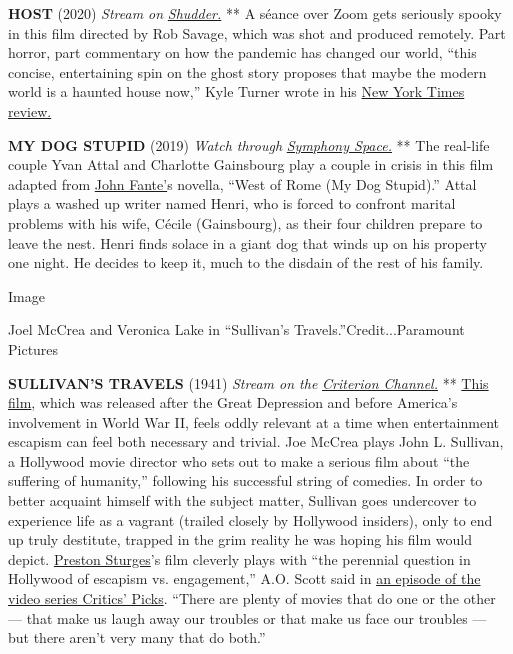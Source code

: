 \textbf{HOST} (2020) \emph{Stream on}
\href{https://www.shudder.com/}{\emph{Shudder.}} ** A séance over Zoom
gets seriously spooky in this film directed by Rob Savage, which was
shot and produced remotely. Part horror, part commentary on how the
pandemic has changed our world, ``this concise, entertaining spin on the
ghost story proposes that maybe the modern world is a haunted house
now,'' Kyle Turner wrote in his
\href{https://www.nytimes3xbfgragh.onion/2020/07/30/movies/host-review.html}{New
York Times review.}

\textbf{MY DOG STUPID} (2019) \emph{Watch through}
\href{https://distribfilmsusvirtual.vhx.tv/products/my-dog-stupid-symphony-space}{\emph{Symphony
Space.}} ** The real-life couple Yvan Attal and Charlotte Gainsbourg
play a couple in crisis in this film adapted from
\href{https://www.nytimes3xbfgragh.onion/2002/02/28/books/books-of-the-times-a-truly-famous-unknown-writer.html?searchResultPosition=1}{John
Fante'}s novella, ``West of Rome (My Dog Stupid).'' Attal plays a washed
up writer named Henri, who is forced to confront marital problems with
his wife, Cécile (Gainsbourg), as their four children prepare to leave
the nest. Henri finds solace in a giant dog that winds up on his
property one night. He decides to keep it, much to the disdain of the
rest of his family.

Image

Joel McCrea and Veronica Lake in ``Sullivan's
Travels.''Credit...Paramount Pictures

\textbf{SULLIVAN'S TRAVELS} (1941) \emph{Stream on the}
\href{https://www.criterionchannel.com/}{\emph{Criterion Channel.}} **
\href{https://www.nytimes3xbfgragh.onion/1942/01/29/archives/comic-tour-in-sullivans-travels-on-the-paramounts-screen-a-yank-on.html}{This
film}, which was released after the Great Depression and before
America's involvement in World War II, feels oddly relevant at a time
when entertainment escapism can feel both necessary and trivial. Joe
McCrea plays John L. Sullivan, a Hollywood movie director who sets out
to make a serious film about ``the suffering of humanity,'' following
his successful string of comedies. In order to better acquaint himself
with the subject matter, Sullivan goes undercover to experience life as
a vagrant (trailed closely by Hollywood insiders), only to end up truly
destitute, trapped in the grim reality he was hoping his film would
depict.
\href{https://www.nytimes3xbfgragh.onion/2005/04/01/movies/sturgess-travels-a-screwball-tale.html}{Preston
Sturges}'s film cleverly plays with ``the perennial question in
Hollywood of escapism vs. engagement,'' A.O. Scott said in
\href{https://www.nytimes3xbfgragh.onion/video/arts/1194826561460/critics-picks-sullivan-s-travels.html}{an
episode of the video series Critics' Picks}. ``There are plenty of
movies that do one or the other --- that make us laugh away our troubles
or that make us face our troubles --- but there aren't very many that do
both.''


